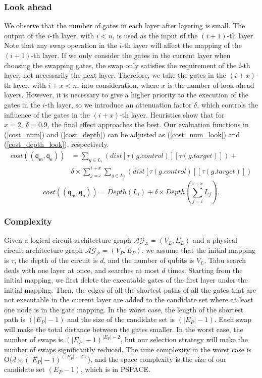 \documentclass[journal]{IEEEtran}
\begin{document}
\subsubsection{Look ahead}
We observe that the number of gates in each layer after layering is small. The output of the $i$-th layer, with $i<n$,  is used as the input of the $(i+1)$-th layer. Note that any swap operation in the $i$-th layer will affect the mapping of the $(i+1)$-th layer. If we only consider the gates in the current layer when choosing the swapping gates, the swap only satisfies the requirement of the $i$-th layer, not necessarily the next layer. Therefore, we take the gates in the $(i+x)$-th layer, with $i+x<n$,  into consideration, where $x$ is the number of look-ahead layers. However, it is necessary to give a higher priority to the execution of the gates in the $i$-th layer, so we introduce an attenuation factor $\delta$, which controls the influence of the gates in the $(i+x)$-th layer. Heuristics show that for $x=2,\ \delta=0.9$, the final effect approaches the best. Our evaluation functions in (\ref{cost_num}) and  (\ref{cost_depth}) can be adjusted as
(\ref{cost_num_look}) and  (\ref{cost_depth_look}), respectively.
 \begin{equation}
	 	\begin{aligned}
			cost((\textsf{q}_\textsf{m},\textsf{q}_\textsf{n}))&=\sum_{g \in L_{i}}(dist[\tau(g.control)][\tau(g.target)])+\\
	&\delta \times \sum_{j=i}^{i+x}\sum_{g \in L_{j}}(dist[\tau(g.control)][\tau(g.target)])
	\label{cost_num_look}
	\end{aligned}
 \end{equation}
	\begin{equation}
		cost((\textsf{q}_\textsf{m},\textsf{q}_\textsf{n}))= Depth(L_{i})+\delta \times Depth(\sum_{j=i}^{i+x}L_{j}).
		\label{cost_depth_look}
		\end{equation}
\subsubsection{Complexity}
Given a logical circuit architecture graph  $\mathcal{AG_{L}}=(V_{L},E_{L})$ and a physical circuit architecture graph $\mathcal{AG_{P}}=(V_{P},E_{P})$, we assume that the initial mapping is $\tau$, the depth of the circuit is $d$, and the number of qubits is $V_{L}$. Tabu search deals with one layer at once, and searches at most $d$ times. Starting from the initial mapping, we first delete the executable gates of the first layer under the initial mapping. Then, the edges of all the shortest paths of all the gates that are not executable in the current layer are added to the candidate set where at least one node is in the gate mapping. In the worst case, the length of the shortest path  is $(|E_{P}|-1)$
and the size of the candidate set  is $(|E_{P}|-1)$. Each swap will make the total distance between the gates smaller. In the worst case, the number of swaps is $(|E_{P}|-1)^{|E_{P}|-2}$, but our selection strategy will make the number of swaps significantly reduced. The time complexity in the worst case is O($d\times (|E_{P}|-1)^{(|E_{P}|-2)}$), and the space complexity is the size of our candidate set $(E_{P}-1)$, which is in PSPACE.
\end{document}
